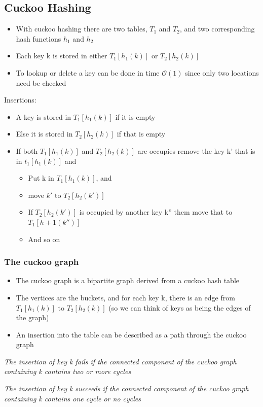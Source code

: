 \documentclass{article}[18pt]
\begin{document}
\subsection{Cuckoo Hashing}
\begin{itemize}
	\item With cuckoo hashing there are two tables, $T_1$ and $T_2$, and two corresponding hash functions $h_1$ and $h_2$
	\item Each key k is stored in either $T_1[h_1(k)]$ or $T_2[h_2(k)]$
	\item To lookup or delete a key can be done in time $\mathcal{O}(1)$ since only two locations need be checked
\end{itemize}
Insertions:
\begin{itemize}
	\item A key is stored in $T_1[h_1(k)]$ if it is empty
	\item Else it is stored in $T_2[h_2(k)]$ if that is empty
	\item If both $T_1[h_1(k)]$ and $T_2[h_2(k)]$ are occupies remove the key k' that is in $t_1[h_1(k)]$ and
	\begin{itemize}
		\item Put k in $T_1[h_1(k)]$, and
		\item move $k'$ to $T_2[h_2(k')]$
		\item If $T_2[h_2(k')]$ is occupied by another key k'' them move that to $T_1[h+1(k'')]$
		\item And so on
	\end{itemize}
\end{itemize}
\subsubsection{The cuckoo graph}
\begin{itemize}
	\item The cuckoo graph is a bipartite graph derived from a cuckoo hash table
	\item The vertices are the buckets, and for each key k, there is an edge from $T_1[h_1(k)]$ to $T_2[h_2(k)]$ (so we can think of keys as being the edges of the graph)
	\item An insertion into the table can be described as a path through the cuckoo graph
\end{itemize}
\begin{center}
	\textit{The insertion of key k fails if the connected component of the cuckoo graph containing k contains two or more cycles}
\end{center}
\begin{center}
	\textit{The insertion of key k succeeds if the connected component of the cuckoo graph containing k contains one cycle or no cycles}
\end{center}
\end{document}

